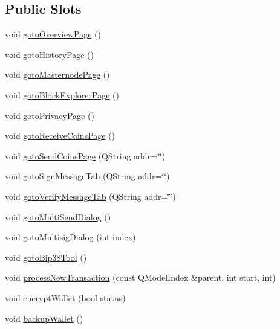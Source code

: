 \subsection*{Public Slots}
\begin{DoxyCompactItemize}
\item 
void \mbox{\hyperlink{class_wallet_view_ac9065162b1cf4700f733d1fb119bd973}{goto\+Overview\+Page}} ()
\item 
void \mbox{\hyperlink{class_wallet_view_a04b97e2623ac678e92111f1db14fde83}{goto\+History\+Page}} ()
\item 
void \mbox{\hyperlink{class_wallet_view_a0cdc8766e5d590b18338d23c226e5565}{goto\+Masternode\+Page}} ()
\item 
void \mbox{\hyperlink{class_wallet_view_a7a537efdf362fbbe43098eb147362159}{goto\+Block\+Explorer\+Page}} ()
\item 
void \mbox{\hyperlink{class_wallet_view_a69e62e77e7a4b9fc4c43b07d41b04600}{goto\+Privacy\+Page}} ()
\item 
void \mbox{\hyperlink{class_wallet_view_a55ebee0d484c3ada114197050ec417db}{goto\+Receive\+Coins\+Page}} ()
\item 
void \mbox{\hyperlink{class_wallet_view_a2a70c2b00b097dd7b83b6915bb037ea3}{goto\+Send\+Coins\+Page}} (Q\+String addr=\char`\"{}\char`\"{})
\item 
void \mbox{\hyperlink{class_wallet_view_a6443ddcb872a1743a61102a3dcd2d560}{goto\+Sign\+Message\+Tab}} (Q\+String addr=\char`\"{}\char`\"{})
\item 
void \mbox{\hyperlink{class_wallet_view_a0a23aaaf87d3aec5ae8b1b8320d66796}{goto\+Verify\+Message\+Tab}} (Q\+String addr=\char`\"{}\char`\"{})
\item 
void \mbox{\hyperlink{class_wallet_view_abddf68fced738b62ad65d4e86ef54c4c}{goto\+Multi\+Send\+Dialog}} ()
\item 
void \mbox{\hyperlink{class_wallet_view_a73b3738ee4714ac1f461bfa84a249ab9}{goto\+Multisig\+Dialog}} (int index)
\item 
void \mbox{\hyperlink{class_wallet_view_adeeea711b11aaaaedeba5cb4500fd3d1}{goto\+Bip38\+Tool}} ()
\item 
void \mbox{\hyperlink{class_wallet_view_addde7d2260658ee06f47f9c095a8cb2a}{process\+New\+Transaction}} (const Q\+Model\+Index \&parent, int start, int)
\item 
void \mbox{\hyperlink{class_wallet_view_a164c3de8fc69ef6f39fb7c15e4bda553}{encrypt\+Wallet}} (bool status)
\item 
void \mbox{\hyperlink{class_wallet_view_a9800d793b552076b4207276d9e08c8b6}{backup\+Wallet}} ()

\end{DoxyCompactItemize}

